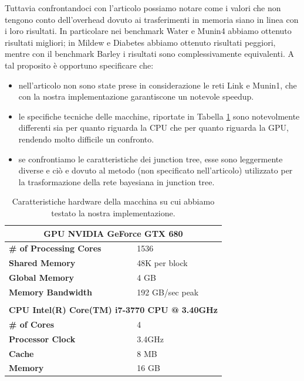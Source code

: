 \documentclass[a4paper]{article}   %
\begin{document}



Tuttavia confrontandoci con l'articolo \cite{zheng2011belief} possiamo notare come i valori che non tengono conto dell'overhead dovuto ai trasferimenti in memoria siano in linea con i loro risultati.
In particolare nei benchmark Water e Munin4 abbiamo ottenuto risultati migliori; in Mildew e Diabetes abbiamo ottenuto risultati peggiori, mentre con il benchmark Barley i risultati sono complessivamente equivalenti.
A tal proposito è opportuno specificare che:
\begin{itemize}
\item nell'articolo \cite{zheng2011belief} non sono state prese in considerazione le reti Link e Munin1, che con la nostra implementazione garantiscone un notevole speedup.
\item le specifiche tecniche delle macchine, riportate in Tabella \ref{tab:hw} sono notevolmente differenti sia per quanto riguarda la CPU che per quanto riguarda la GPU, rendendo molto difficile un confronto.
\item %
se confrontiamo le caratteristiche dei junction tree, esse sono leggermente diverse e ciò e dovuto al metodo (non specificato nell'articolo) utilizzato per la trasformazione della rete bayesiana in junction tree.
\end{itemize}


\begin{table}
\centering
\begin{tabular}{l | l}
\toprule
\multicolumn{2}{c}{\textbf{GPU NVIDIA GeForce GTX 680}} \\
\midrule
\textbf{\# of Processing Cores}	& 1536 \\
\textbf{Shared Memory} &	48K per block \\
\textbf{Global Memory} &	4 GB \\
\textbf{Memory Bandwidth} &	192 GB/sec peak \\
\bottomrule
\multicolumn{2}{c}{} \\
\toprule
\multicolumn{2}{c}{\textbf{CPU	Intel(R) Core(TM) i7-3770 CPU @ 3.40GHz}} \\
\midrule
\textbf{\# of Cores} &	4 \\
\textbf{Processor Clock} &	3.4GHz  \\
\textbf{Cache} &	8 MB \\
\textbf{Memory} &	16 GB \\
\bottomrule
\end{tabular}
\caption{Caratteristiche hardware della macchina su cui abbiamo testato la nostra implementazione.}
\label{tab:hw}
\end{table}
\end{document}
